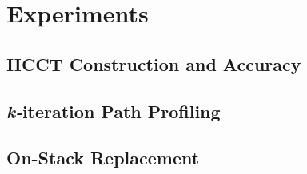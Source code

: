 \chapter{Experiments}

\section{HCCT Construction and Accuracy}

\section{{\em k-}iteration Path Profiling}

\section{On-Stack Replacement}